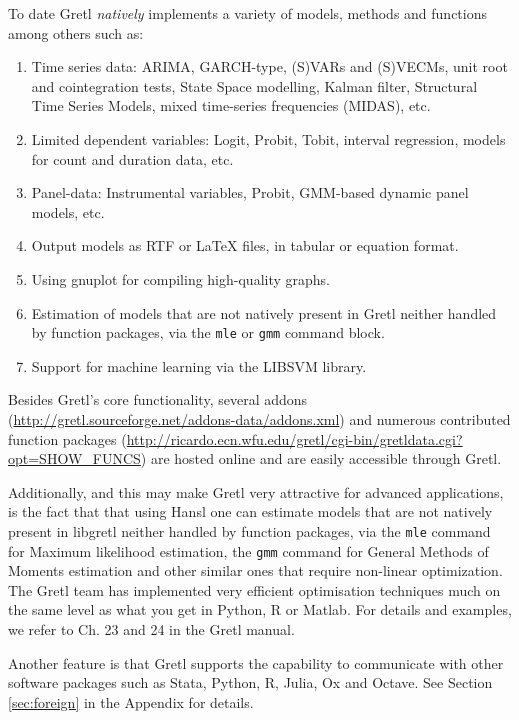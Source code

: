 \documentclass[11pt]{article}
\begin{document}
To date Gretl \textit{natively} implements a variety of models, methods and functions among others such as: 
\begin{enumerate}
	\item Time series data: ARIMA, GARCH-type, (S)VARs and (S)VECMs, unit root and cointegration tests, State Space modelling, Kalman filter, Structural Time Series Models, mixed time-series frequencies (MIDAS), etc.
	\item Limited dependent variables: Logit, Probit, Tobit, interval regression, models for count and duration data, etc.
	\item Panel-data: Instrumental variables, Probit,
	GMM-based dynamic panel models, etc.
	\item Output models as RTF or LaTeX files, in tabular or equation format.
	\item Using gnuplot for compiling high-quality graphs.
	\item Estimation of models that are not natively present in Gretl neither handled by function packages, via the \texttt{mle} or \texttt{gmm} command block.  
	\item Support for machine learning via the LIBSVM library.
\end{enumerate}
Besides Gretl's core functionality, several addons \\ (\url{http://gretl.sourceforge.net/addons-data/addons.xml}) and numerous contributed function packages (\url{http://ricardo.ecn.wfu.edu/gretl/cgi-bin/gretldata.cgi?opt=SHOW_FUNCS}) are hosted online and are easily accessible through Gretl.

Additionally, and this may make Gretl very attractive for advanced applications, is the fact that that using Hansl one can estimate models that are not natively present in libgretl neither handled by function packages, via the \texttt{mle} command for Maximum likelihood estimation, the \texttt{gmm} command for General Methods of Moments estimation and other similar ones that require non-linear optimization. The Gretl team has implemented very efficient optimisation techniques much on the same level as what you get in Python, R or Matlab. For details and examples, we refer to Ch. 23 and 24 in the Gretl manual.

Another feature is that Gretl supports the capability to communicate with other software packages such as Stata, Python, R, Julia, Ox and Octave. See Section \ref{sec:foreign} in the Appendix for details.%
\end{document}
